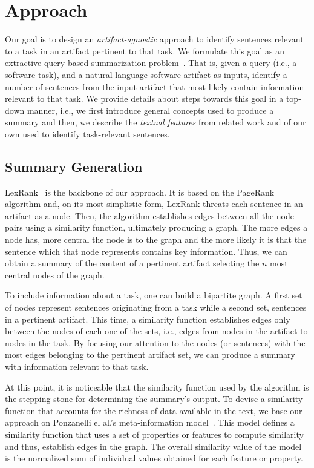 \section{Approach}
\label{cp5:approaches}


Our goal is to design an \textit{artifact-agnostic} approach
to identify sentences relevant to a task in an artifact pertinent to that task.
We formulate this goal as an extractive query-based summarization problem~\cite{Goldsteinet1999}.
That is, given a query (i.e., a software task),
and a natural language software artifact as inputs,
identify a number of sentences from the input artifact that
most likely contain information relevant to that task. 
We provide details about steps towards this goal
in a top-down manner, i.e., we first introduce general concepts
used to produce a summary and then, we describe
the \textit{textual features} from related work and of our own used to identify task-relevant sentences.



\subsection{Summary Generation}


LexRank~\cite{Erkan2004} is the backbone of our approach. 
It is based on the PageRank~\cite{Page1999} algorithm
and, on its most simplistic form, LexRank threats each sentence in an artifact as a node.
Then, the algorithm
establishes edges between all the node pairs using a similarity function, ultimately producing a graph. 
The more edges a node has, more central the node is to the graph and the more likely it is that the sentence 
which that node represents contains key information. 
Thus, we can obtain a summary of the content of a pertinent artifact selecting the $n$ most central nodes of the graph. 


To include information about a task, one can build a bipartite graph.
A first set of nodes represent sentences originating from a task while a second set, sentences in a pertinent artifact.
This time,  a similarity function 
establishes edges only  between the nodes of each one of the sets, i.e., edges from nodes in the artifact to nodes in the task.
By focusing our attention to the nodes (or sentences) with the most edges belonging to the pertinent artifact set, we can produce a summary with information relevant to that task.




At this point, it is noticeable that the similarity function used by the algorithm 
is the stepping stone for determining the summary's output.  
To devise a similarity function that accounts for the richness of data available in the 
text, we base our approach on Ponzanelli el al.'s meta-information model~\cite{Ponzanelli2015}.
This model defines a similarity function that uses a set of properties or features to compute similarity and thus, establish edges in the graph.
The overall similarity value of the model is the normalized sum of individual values obtained for each feature or property.


